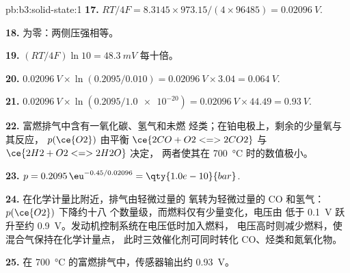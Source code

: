 \begin{solution}{pb:b3:solid-state:1}
\textbf{17.} $RT/4F = 8.3145 \times 973.15/(4 \times 96485) = \qty{0.02096}{V}$.

\textbf{18.} 为零：两侧压强相等。

\textbf{19.} $(RT/4F)\ln 10 = \qty{48.3}{mV}$ 每十倍。

\textbf{20.} $\qty{0.02096}{V} \times \ln(0.2095/0.010) = \qty{0.02096}{V} \times 3.04 = \qty{0.064}{V}$.

\textbf{21.} $\qty{0.02096}{V} \times \ln(0.2095/\num{1.0e-20}) = \qty{0.02096}{V} \times 44.49 = \qty{0.93}{V}$.

\textbf{22.} 富燃排气中含有一氧化碳、氢气和未燃
烃类；在铂电极上，剩余的少量氧与其反应，
$p(\ce{O2})$ 由平衡 $\ce{2CO + O2 <=> 2CO2}$ 与 $\ce{2H2 + O2 <=> 2H2O}$ 决定，
两者使其在 \qty{700}{\celsius} 时的数值极小。

\textbf{23.} $p = 0.2095\,\eu^{-0.45/0.02096} = \qty{1.0e-10}{bar}$.

\textbf{24.} 在化学计量比附近，排气由轻微过量的
氧转为轻微过量的 CO 和氢气：$p(\ce{O2})$ 下降约十八
个数量级，而燃料仅有少量变化，电压由
低于 \qty{0.1}{V} 跃升至约 \qty{0.9}{V}。发动机控制系统在电压低时加入燃料，
电压高时则减少燃料，使混合气保持在化学计量点，
此时三效催化剂可同时转化 CO、烃类和氮氧化物。

\textbf{25.} 在 \qty{700}{\celsius} 的富燃排气中，传感器输出约 \qty{0.93}{V}。
\end{solution}
